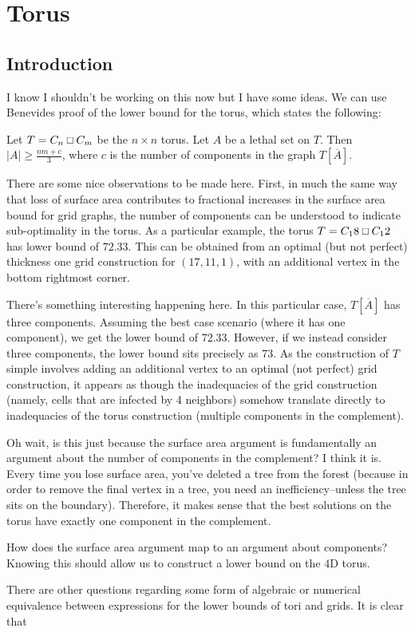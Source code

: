 \chapter{Torus}

\section{Introduction}

I know I shouldn't be working on this now but I have some ideas. We can use Benevides proof of the lower bound for the torus, which states the following:

\begin{lem}
Let $T = C_n \Osq C_m$ be the $n \times n$ torus. Let $A$ be a lethal set on $T$. Then $|A| \geq \frac{nm + c}{3}$, where $c$ is the number of components in the graph $T[\overline{A}]$. 
\end{lem}

There are some nice observations to be made here. First, in much the same way that loss of surface area contributes to fractional increases in the surface area bound for grid graphs, the number of components can be understood to indicate sub-optimality in the torus. As a particular example, the torus $T = C_18 \Osq C_12$ has lower bound of $72.33$. This can be obtained from an optimal (but not perfect) thickness one grid construction for $(17,11,1)$, with an additional vertex in the bottom rightmost corner. 

There's something interesting happening here. In this particular case, $T[\overline{A}]$ has three components. Assuming the best case scenario (where it has one component), we get the lower bound of 72.33. However, if we instead consider three components, the lower bound sits precisely as 73. As the construction of $T$ simple involves adding an additional vertex to an optimal (not perfect) grid construction, it appears as though the inadequacies of the grid construction (namely, cells that are infected by 4 neighbors) somehow translate directly to inadequacies of the torus construction (multiple components in the complement). 

Oh wait, is this just because the surface area argument is fundamentally an argument about the number of components in the complement? I think it is. Every time you lose surface area, you've deleted a tree from the forest (because in order to remove the final vertex in a tree, you need an inefficiency--unless the tree sits on the boundary). Therefore, it makes sense that the best solutions on the torus have exactly one component in the complement.

How does the surface area argument map to an argument about components? Knowing this should allow us to construct a lower bound on the 4D torus.

There are other questions regarding some form of algebraic or numerical equivalence between expressions for the lower bounds of tori and grids. It is clear that 